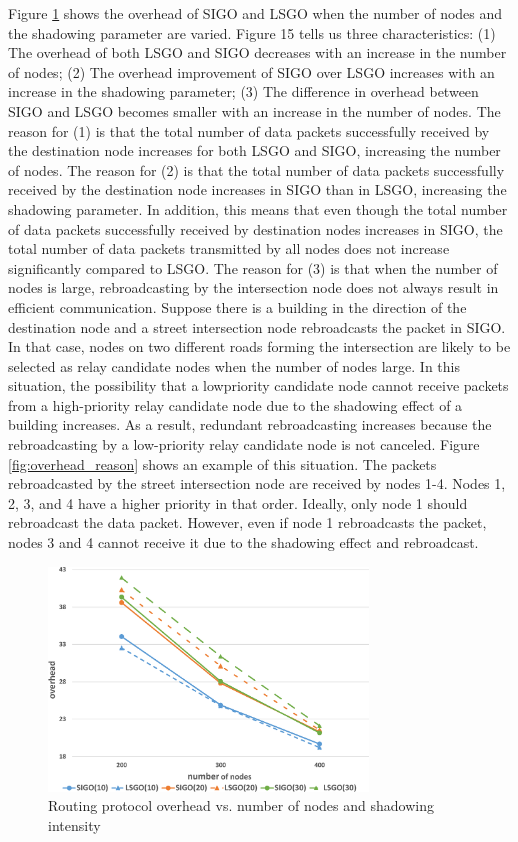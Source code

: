 \documentclass[conference]{IEEEtran}
\begin{document}
Figure \ref{fig:overhead} shows the overhead of SIGO and LSGO when the number of nodes and the shadowing parameter are varied. Figure 15 tells us three characteristics: (1) The overhead of both LSGO and SIGO decreases with an increase in the number of nodes; (2) The overhead improvement of SIGO over LSGO increases with an increase in the shadowing parameter; (3) The diﬀerence in overhead between SIGO and LSGO becomes smaller with an increase in the number of nodes. The reason for (1) is that the total number of data packets successfully received by the destination node increases for both LSGO and SIGO, increasing the number of nodes. The reason for (2) is that the total number of data packets successfully received by the destination node increases in SIGO than in LSGO, increasing the shadowing parameter. In addition, this means that even though the total number of data packets successfully received by destination nodes increases in SIGO, the total number of data packets transmitted by all nodes does not increase signiﬁcantly compared to LSGO. The reason for (3) is that when the number of nodes is large, rebroadcasting by the intersection node does not always result in efficient communication. Suppose there is a building in the direction of the destination node and a street intersection node rebroadcasts the packet in SIGO. In that case, nodes on two diﬀerent roads forming the intersection are likely to be selected as relay candidate nodes when the number of nodes large. In this situation, the possibility that a lowpriority candidate node cannot receive packets from a high-priority relay candidate node due to the shadowing effect of a building increases. As a result, redundant rebroadcasting increases because the rebroadcasting by a low-priority relay candidate node is not canceled. Figure \ref{fig:overhead_reason} shows an example of this situation. The packets rebroadcasted by the street intersection node are received by nodes 1-4. Nodes 1, 2, 3, and 4 have a higher priority in that order. Ideally, only node 1 should rebroadcast the data packet. However, even if node 1 rebroadcasts the packet, nodes 3 and 4 cannot receive it due to the shadowing eﬀect and rebroadcast.






\begin{figure}[!ht]
\centering
\includegraphics[width=85mm]{figures/overhead.eps}
\caption{Routing protocol overhead vs. number of nodes and shadowing intensity }
\label{fig:overhead}
\end{figure}
\end{document}
